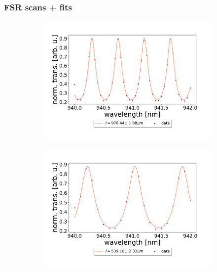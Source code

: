 \subsubsection*{FSR scans + fits}

\begin{figure}[h!]
    \centering
    \begin{subfigure}[b]{0.49\textwidth}
        \includegraphics[width=\textwidth]{figures/results/double fano fits/1000um_M3:M5_FSR_scan.pdf}
        \caption{}
        \label{fig:1000um_M3:M5_FSR_scan}
    \end{subfigure}
    \begin{subfigure}[b]{0.49\textwidth}
        \includegraphics[width=\textwidth]{figures/results/double fano fits/550um_M3:M5_FSR_scan.pdf}
        \caption{}
        \label{fig:550um_M3:M5_FSR_scan}

\end{subfigure}
\end{figure}
